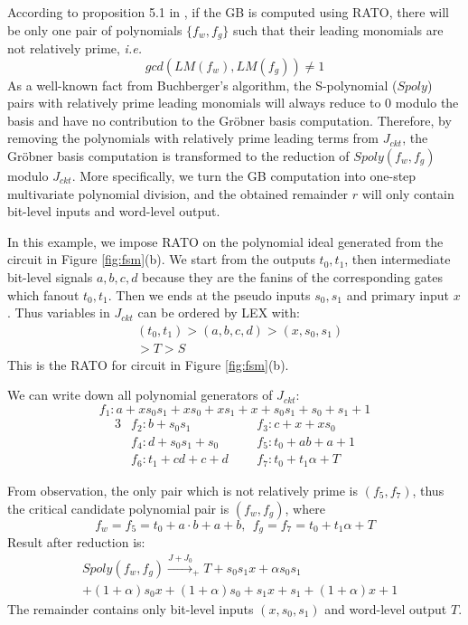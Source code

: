 According to proposition 5.1 in \cite{pruss:tcad15}, if the GB is computed using RATO, 
there will be only one pair of polynomials $\{f_w,f_g\}$ such that 
their leading monomials are not relatively prime, {\it i.e.} 
$$gcd(LM(f_w), LM(f_g)) \neq 1$$
As a well-known fact from Buchberger's algorithm, the S-polynomial 
($Spoly$) pairs with relatively prime 
leading monomials will always reduce to 0 modulo the basis and have no contribution to 
the Gr\"obner basis computation.
Therefore, by removing the polynomials with relatively prime leading terms from $J_{ckt}$, 
the Gr\"obner basis computation is transformed to the reduction of 
$Spoly(f_w,f_g)$ modulo $J_{ckt}$. More specifically, we turn the
GB computation into one-step multivariate polynomial division, and the obtained
remainder $r$ will only contain bit-level inputs and word-level output. 

\begin{Example}
In this example, we impose RATO on the polynomial ideal generated from the circuit in Figure \ref{fig:fsm}(b).
We start from the outputs $t_0,t_1$, then intermediate bit-level signals $a,b,c,d$ because they are 
the fanins of the corresponding gates which fanout $t_0,t_1$. Then we ends at the pseudo inputs $s_0,s_1$
and primary input $x$.
Thus variables in $J_{ckt}$ can be ordered by LEX with:
\begin{align}
&(t_0,t_1)>(a,b,c,d)>(x,s_0,s_1)\nonumber\\&>T>S\nonumber
\end{align}
This is the RATO for circuit in Figure \ref{fig:fsm}(b).

We can write down all polynomial generators of $J_{ckt}$:
\begin{equation*}
f_1: a+xs_0s_1+xs_0+xs_1+x+s_0s_1+s_0+s_1+1
\end{equation*}
\vspace{-0.8cm}
\begin{alignat*}{3}
& f_2: b+s_0s_1 &&~~~ f_3: c+x+xs_0 \\
& f_4: d+s_0s_1+s_0 &&~~~ f_5: t_0+ab+a+1 \\
& f_6: t_1+cd+c+d &&~~~ f_7: t_0+t_1\alpha+T 
\end{alignat*}

From observation, the only pair which is not relatively prime is
$(f_5,f_7)$, thus the critical candidate polynomial pair is
$(f_w,f_g)$, where $$f_w =f_5= t_0+a\cdot b+a+b, ~~f_g =f_7=t_0+t_1\alpha + T$$
Result after reduction is:
\begin{align}
&Spoly(f_w,f_g) \xrightarrow{J+J_0}_{+}T + s_0 s_1 x+\alpha s_0 s_1 \nonumber\\
&+(1+\alpha)s_0 x+(1+\alpha) s_0+s_1 x+s_1+(1+\alpha) x+1\nonumber
\end{align}
The remainder contains only bit-level inputs $(x,s_0,s_1)$ and word-level output $T$.
\end{Example}


